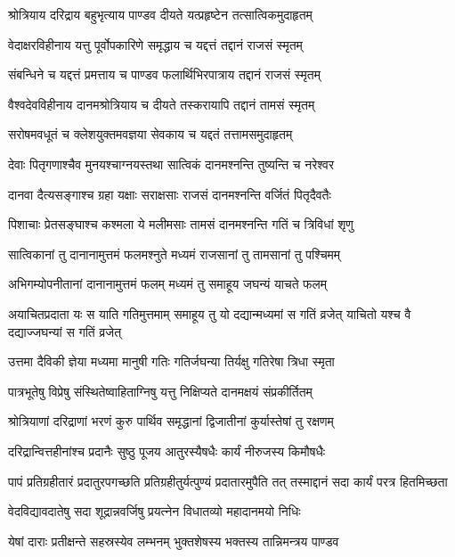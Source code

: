 \twolineshloka
{श्रोत्रियाय दरिद्राय बहुभृत्याय पाण्डव}
{दीयते यत्प्रहृष्टेन तत्सात्विकमुदाहृतम्}


\twolineshloka
{वेदाक्षरविहीनाय यत्तु पूर्वोपकारिणे}
{समृद्धाय च यद्दत्तं तद्दानं राजसं स्मृतम्}


\twolineshloka
{संबन्धिने च यद्दत्तं प्रमत्ताय च पाण्डव}
{फलार्थिभिरपात्राय तद्दानं राजसं स्मृतम्}


\twolineshloka
{वैश्वदेवविहीनाय दानमश्रोत्रियाय च}
{दीयते तस्करायापि तद्दानं तामसं स्मृतम्}


\twolineshloka
{सरोषमवधूतं च क्लेशयुक्तमवज्ञया}
{सेवकाय च यद्दतं तत्तामसमुदाहृतम्}


\twolineshloka
{देवाः पितृगणाश्चैव मुनयश्चाग्नयस्तथा}
{सात्विकं दानमश्नन्ति तुष्यन्ति च नरेश्वर}


\twolineshloka
{दानवा दैत्यसङ्गाश्च ग्रहा यक्षाः सराक्षसाः}
{राजसं दानमश्नन्ति वर्जितं पितृदैवतैः}


\twolineshloka
{पिशाचाः प्रेतसङ्घाश्च कश्मला ये मलीमसाः}
{तामसं दानमश्नन्ति गतिं च त्रिविधां शृणु}


\twolineshloka
{सात्विकानां तु दानानामुत्तमं फलमश्नुते}
{मध्यमं राजसानां तु तामसानां तु पश्चिमम्}


\twolineshloka
{अभिगम्योपनीतानां दानानामुत्तमं फलम्}
{मध्यमं तु समाहूय जघन्यं याचते फलम्}


\threelineshloka
{अयाचितप्रदाता यः स याति गतिमुत्तमाम्}
{समाहूय तु यो दद्यान्मध्यमां स गतिं व्रजेत्}
{याचितो यश्च वै दद्याज्जघन्यां स गतिं व्रजेत्}


\twolineshloka
{उत्तमा दैविकी ज्ञेया मध्यमा मानुषी गतिः}
{गतिर्जघन्या तिर्यक्षु गतिरेषा त्रिधा स्मृता}


\twolineshloka
{पात्रभूतेषु विप्रेषु संस्थितेष्वाहिताग्निषु}
{यत्तु निक्षिप्यते दानमक्षयं संप्रकीर्तितम्}


\twolineshloka
{श्रोत्रियाणां दरिद्राणां भरणं कुरु पार्थिव}
{समृद्धानां द्विजातीनां कुर्यास्तेषां तु रक्षणम्}


\twolineshloka
{दरिद्रान्वित्तहीनांश्च प्रदानैः सुष्ठु पूजय}
{आतुरस्यैषधैः कार्यं नीरुजस्य किमौषधैः}


\threelineshloka
{पापं प्रतिग्रहीतारं प्रदातुरपगच्छति}
{प्रतिग्रहीतुर्यत्पुण्यं प्रदातारमुपैति तत्}
{तस्माद्दानं सदा कार्यं परत्र हितमिच्छता}


\twolineshloka
{वेदविद्यावदातेषु सदा शूद्रान्नवर्जिषु}
{प्रयत्नेन विधातव्यो महादानमयो निधिः}


\twolineshloka
{येषां दाराः प्रतीक्षन्ते सहस्रस्येव लम्भनम्}
{भुक्तशेषस्य भक्तस्य तान्निमन्त्रय पाण्डव}


